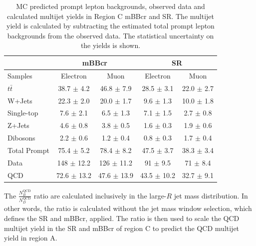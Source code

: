 \begin{table}
\begin{center}
\begin{tabular}{l|c|c||c|c}
             &\multicolumn{2}{c||}{mBBcr}               &\multicolumn{2}{c}{SR}\\
\hline
Samples       & Electron            & Muon               & Electron         & Muon     \\      
\hline
$t\bar{t}$    &  38.7   $\pm$ 4.2   & 46.8  $\pm$ 7.9    & 28.5 $\pm$ 3.1   & 22.0 $\pm$ 2.7  \\
W+Jets        &  22.3   $\pm$ 2.0   & 20.0  $\pm$ 1.7    &  9.6 $\pm$ 1.3   & 10.0 $\pm$ 1.8  \\        
Single-top    &   7.6   $\pm$ 2.1   &  6.5  $\pm$ 1.3    &  7.1 $\pm$ 1.5   &  2.7 $\pm$ 0.8  \\
Z+Jets        &   4.6   $\pm$ 0.8   &  3.8  $\pm$ 0.5    &  1.6 $\pm$ 0.3   &  1.9 $\pm$ 0.6  \\
Dibosons      &   2.2   $\pm$ 0.6   &  1.2  $\pm$ 0.4    &  0.8 $\pm$ 0.3   &  1.7 $\pm$ 0.4  \\
\hline
Total Prompt  &  75.4   $\pm$ 5.2   & 78.4  $\pm$ 8.2    & 47.5 $\pm$ 3.7   & 38.3 $\pm$ 3.4  \\
\hline
Data          &  148    $\pm$ 12.2  & 126   $\pm$ 11.2   & 91   $\pm$ 9.5   & 71   $\pm$ 8.4  \\
\hline
QCD           & 72.6    $\pm$ 13.2  &  47.6 $\pm$ 13.9   & 43.5 $\pm$ 10.2  & 32.7 $\pm$ 9.1  \\
\end{tabular}
\end{center}
\caption[MC predicted prompt lepton backgrounds, observed data and calculated multijet yields
in Region C mBBcr and SR]{MC predicted prompt lepton backgrounds, observed data and calculated multijet yields
in Region C mBBcr and SR. The multijet yield is calculated by subtracting the estimated total prompt lepton
backgrounds from the observed data. The statistical uncertainty on the yields is shown.}
\label{tab:boosted_region_c_promptbkgd_data}
\end{table}
 
The $\frac{N_B^\text{QCD}}{N_D^\text{QCD}}$ ratio are calculated inclusively in the large-$R$ jet mass distribution.
In other words, the ratio is calculated without the jet mass window selection, which defines the SR and mBBcr, applied.
The ratio is then used to scale the QCD multijet yield in the SR and mBBcr of region C to predict the QCD multijet yield
in region A.
 
